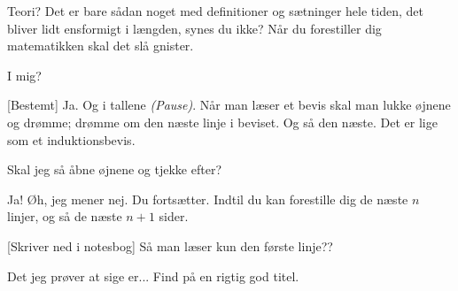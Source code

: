 \documentclass[a4paper,11pt]{article}
\begin{document}
\begin{sketch}
 Teori? Det er bare sådan noget med definitioner og sætninger hele tiden, det bliver lidt ensformigt i længden, synes du ikke? Når du forestiller dig matematikken skal det slå gnister.

 I mig?

[Bestemt] Ja. Og i tallene \emph{(Pause)}. Når man læser et bevis skal man lukke øjnene og drømme; drømme om den næste linje i beviset. Og så den næste. Det er lige som et induktionsbevis.

 Skal jeg så åbne øjnene og tjekke efter?

 Ja! Øh, jeg mener nej. Du fortsætter. Indtil du kan forestille dig de næste $n$ linjer, og så de næste $n+1$ sider.

[Skriver ned i notesbog] Så man læser kun den første linje??

 Det jeg prøver at sige er... Find på en rigtig god titel.

\end{sketch}
\end{document}
